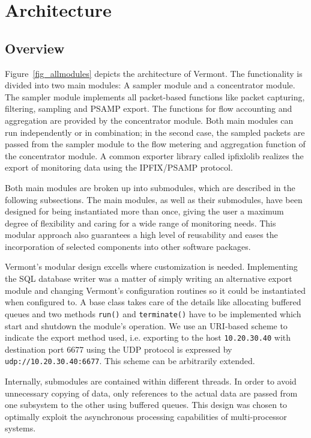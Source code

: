 \section{Architecture}
\label{sec:architecture}

\subsection{Overview}

Figure~\ref{fig_allmodules} depicts the architecture of Vermont.
The functionality is divided into two main modules: A sampler module and a concentrator module.
The sampler module implements all packet-based functions like packet capturing, filtering, sampling and PSAMP export.
The functions for flow accounting and aggregation are provided by the concentrator module.
Both main modules can run independently or in combination; in the second case, the sampled packets are passed from the sampler module to the flow metering and aggregation function of the concentrator module.
A common exporter library called ipfixlolib realizes the export of monitoring data using the IPFIX/PSAMP protocol.

Both main modules are broken up into submodules, which are described in the following subsections.
The main modules, as well as their submodules, have been designed for being instantiated more than once, giving the user a maximum degree of flexibility and caring for a wide range of monitoring needs.
This modular approach also guarantees a high level of reusability and eases the incorporation of selected components into other software packages.

Vermont's modular design excells where customization is needed. Implementing the SQL database writer was a matter of simply writing an alternative export module and changing Vermont's configuration routines so it could be instantiated when configured to. A base class takes care of the details like allocating buffered queues and two methods \texttt{run()} and \texttt{terminate()} have to be implemented which start and shutdown the module's operation.
We use an URI-based scheme to indicate the export method used, i.e. exporting to the host \texttt{10.20.30.40} with destination port 6677 using the UDP protocol is expressed by \texttt{udp://10.20.30.40:6677}. This scheme can be arbitrarily extended.

Internally, submodules are contained within different threads.
In order to avoid unnecessary copying of data, only references to the actual data are passed from one subsystem to the other using buffered queues.
This design was chosen to optimally exploit the asynchronous processing capabilities of multi-processor systems.

